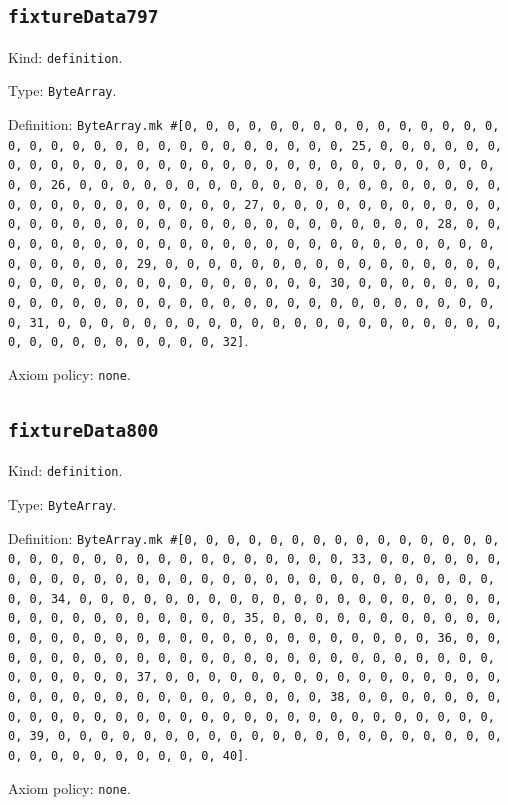 \documentclass[11pt]{article}
\begin{document}
\subsection*{\texttt{fixtureData797}}
\noindent Kind: \texttt{definition}.\par
\noindent Type: \texttt{ByteArray}.\par
\noindent Definition: \texttt{ByteArray.mk \#[0, 0, 0, 0, 0, 0, 0, 0, 0, 0, 0, 0, 0, 0, 0, 0, 0, 0, 0, 0, 0, 0, 0, 0, 0, 0, 0, 0, 0, 0, 0, 25, 0, 0, 0, 0, 0, 0, 0, 0, 0, 0, 0, 0, 0, 0, 0, 0, 0, 0, 0, 0, 0, 0, 0, 0, 0, 0, 0, 0, 0, 0, 0, 26, 0, 0, 0, 0, 0, 0, 0, 0, 0, 0, 0, 0, 0, 0, 0, 0, 0, 0, 0, 0, 0, 0, 0, 0, 0, 0, 0, 0, 0, 0, 0, 27, 0, 0, 0, 0, 0, 0, 0, 0, 0, 0, 0, 0, 0, 0, 0, 0, 0, 0, 0, 0, 0, 0, 0, 0, 0, 0, 0, 0, 0, 0, 0, 28, 0, 0, 0, 0, 0, 0, 0, 0, 0, 0, 0, 0, 0, 0, 0, 0, 0, 0, 0, 0, 0, 0, 0, 0, 0, 0, 0, 0, 0, 0, 0, 29, 0, 0, 0, 0, 0, 0, 0, 0, 0, 0, 0, 0, 0, 0, 0, 0, 0, 0, 0, 0, 0, 0, 0, 0, 0, 0, 0, 0, 0, 0, 0, 30, 0, 0, 0, 0, 0, 0, 0, 0, 0, 0, 0, 0, 0, 0, 0, 0, 0, 0, 0, 0, 0, 0, 0, 0, 0, 0, 0, 0, 0, 0, 0, 31, 0, 0, 0, 0, 0, 0, 0, 0, 0, 0, 0, 0, 0, 0, 0, 0, 0, 0, 0, 0, 0, 0, 0, 0, 0, 0, 0, 0, 0, 0, 0, 32]}.\par
\noindent Axiom policy: \texttt{none}.\par
\subsection*{\texttt{fixtureData800}}
\noindent Kind: \texttt{definition}.\par
\noindent Type: \texttt{ByteArray}.\par
\noindent Definition: \texttt{ByteArray.mk \#[0, 0, 0, 0, 0, 0, 0, 0, 0, 0, 0, 0, 0, 0, 0, 0, 0, 0, 0, 0, 0, 0, 0, 0, 0, 0, 0, 0, 0, 0, 0, 33, 0, 0, 0, 0, 0, 0, 0, 0, 0, 0, 0, 0, 0, 0, 0, 0, 0, 0, 0, 0, 0, 0, 0, 0, 0, 0, 0, 0, 0, 0, 0, 34, 0, 0, 0, 0, 0, 0, 0, 0, 0, 0, 0, 0, 0, 0, 0, 0, 0, 0, 0, 0, 0, 0, 0, 0, 0, 0, 0, 0, 0, 0, 0, 35, 0, 0, 0, 0, 0, 0, 0, 0, 0, 0, 0, 0, 0, 0, 0, 0, 0, 0, 0, 0, 0, 0, 0, 0, 0, 0, 0, 0, 0, 0, 0, 36, 0, 0, 0, 0, 0, 0, 0, 0, 0, 0, 0, 0, 0, 0, 0, 0, 0, 0, 0, 0, 0, 0, 0, 0, 0, 0, 0, 0, 0, 0, 0, 37, 0, 0, 0, 0, 0, 0, 0, 0, 0, 0, 0, 0, 0, 0, 0, 0, 0, 0, 0, 0, 0, 0, 0, 0, 0, 0, 0, 0, 0, 0, 0, 38, 0, 0, 0, 0, 0, 0, 0, 0, 0, 0, 0, 0, 0, 0, 0, 0, 0, 0, 0, 0, 0, 0, 0, 0, 0, 0, 0, 0, 0, 0, 0, 39, 0, 0, 0, 0, 0, 0, 0, 0, 0, 0, 0, 0, 0, 0, 0, 0, 0, 0, 0, 0, 0, 0, 0, 0, 0, 0, 0, 0, 0, 0, 0, 40]}.\par
\noindent Axiom policy: \texttt{none}.\par
\end{document}
